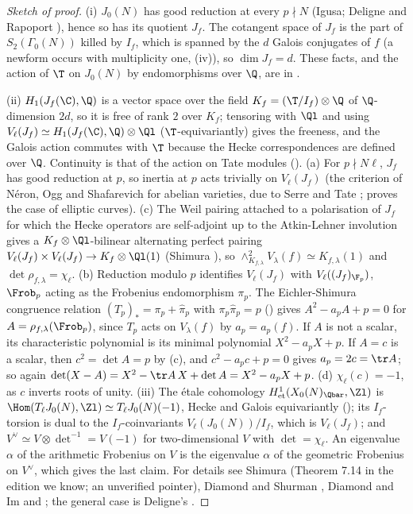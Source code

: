 \begin{proof}[Sketch of proof]
(i) $J_0(N)$ has good reduction at every $p\nmid N$ (Igusa; Deligne and Rapoport \cite{DeligneRapoport73}), hence so has its quotient $J_f$. The
cotangent space of $J_f$ is the part of $S_2(\Gamma_0(N))$ killed by $I_f$, which is spanned by the $d$ Galois conjugates of $f$ (a newform occurs with
multiplicity one, (iv)), so $\dim J_f=d$. These facts, and the action of $\T$ on $J_0(N)$ by endomorphisms over
$\Q$, are in .

(ii) $H_1(J_f(\C),\Q)$ is a vector space over the field $K_f=(\T/I_f)\otimes\Q$ of $\Q$-dimension $2d$, so it is free of rank $2$ over $K_f$; tensoring with $\Ql$
and using $V_\ell(J_f)\simeq H_1(J_f(\C),\Q)\otimes\Ql$ ($\T$-equivariantly) gives the freeness, and the Galois action commutes with $\T$ because the Hecke
correspondences are defined over $\Q$. Continuity is that of the action on Tate modules (). (a) For $p\nmid N\ell$, $J_f$ has good reduction
at $p$, so inertia at $p$ acts trivially on $V_\ell(J_f)$ (the criterion of N\'eron, Ogg and Shafarevich for abelian varieties, due to Serre and Tate
\cite{SerreTate68};  proves the case of elliptic curves). (c) The Weil pairing attached to a polarisation of $J_f$ for which
the Hecke operators are self-adjoint up to the Atkin-Lehner involution gives a $K_f\otimes\Ql$-bilinear alternating perfect pairing $V_\ell(J_f)\times
V_\ell(J_f)\to K_f\otimes\Ql(1)$ (Shimura \cite[Chapter 7]{Shimura71}), so $\wedge^2_{K_{f,\lambda}}V_\lambda(f)\simeq K_{f,\lambda}(1)$ and $\det\rho_{f,\lambda}=\chi_\ell$. (b) Reduction modulo $p$
identifies $V_\ell(J_f)$ with $V_\ell((J_f)_{\F_p})$, $\Frob_p$ acting as the Frobenius endomorphism $\pi_p$. The Eichler-Shimura congruence relation
$(T_p)_*=\pi_p+\hat\pi_p$ with $\pi_p\hat\pi_p=p$ () gives $A^2-a_pA+p=0$ for $A=\rho_{f,\lambda}(\Frob_p)$, since $T_p$ acts on $V_\lambda(f)$ by $a_p=a_p(f)$. If $A$ is
not a scalar, its characteristic polynomial is its minimal polynomial $X^2-a_pX+p$. If $A=c$ is a scalar, then $c^2=\det A=p$ by (c), and $c^2-a_pc+p=0$
gives $a_p=2c=\tr A$; so again $\det(X-A)=X^2-\tr A\,X+\det A=X^2-a_pX+p$. (d) $\chi_\ell(c)=-1$, as $c$ inverts roots of unity. (iii) The \'etale cohomology
$H^1_{\mathrm{et}}(X_0(N)_{\Qbar},\Zl)$ is $\Hom(T_\ell J_0(N),\Zl)\simeq T_\ell J_0(N)(-1)$, Hecke and Galois equivariantly (); its $I_f$-torsion is
dual to the $I_f$-coinvariants $V_\ell(J_0(N))/I_f$, which is $V_\ell(J_f)$; and $V^\vee\simeq V\otimes\det^{-1}=V(-1)$ for two-dimensional $V$ with $\det=\chi_\ell$. An
eigenvalue $\alpha$ of the arithmetic Frobenius on $V$ is the eigenvalue $\alpha$ of the geometric Frobenius on $V^\vee$, which gives the last claim.
For details see Shimura \cite[Chapter 7]{Shimura71} (Theorem 7.14 in the edition we know; an unverified pointer), Diamond and Shurman
\cite[Chapter 9]{DiamondShurman}, Diamond and Im \cite{DiamondIm} and \cite[Theorem 3.1]{DDT}; the general case is Deligne's \cite{Deligne}.
\end{proof}

